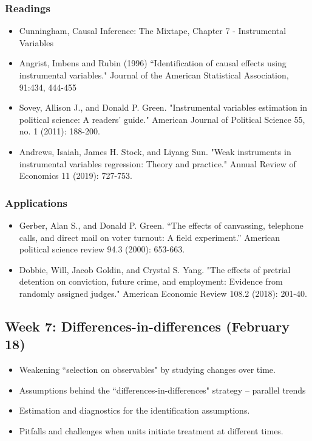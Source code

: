 \documentclass[11pt, article, oneside]{memoir}
\theoremstyle{Assumption}
\begin{document}
\subsubsection*{Readings}

\begin{itemize}
\item Cunningham, Causal Inference: The Mixtape, Chapter 7 - Instrumental Variables
\item Angrist, Imbens and Rubin (1996) ``Identification of causal effects using instrumental variables." Journal of the American Statistical Association, 91:434, 444-455
\item Sovey, Allison J., and Donald P. Green. "Instrumental variables estimation in political science: A readers’ guide." American Journal of Political Science 55, no. 1 (2011): 188-200.
\item Andrews, Isaiah, James H. Stock, and Liyang Sun. "Weak instruments in instrumental variables regression: Theory and practice." Annual Review of Economics 11 (2019): 727-753.
\end{itemize}

\subsubsection{Applications}

\begin{itemize}
\item Gerber, Alan S., and Donald P. Green. “The effects of canvassing, telephone calls,
and direct mail on voter turnout: A field experiment.” American political science
review 94.3 (2000): 653-663.
\item Dobbie, Will, Jacob Goldin, and Crystal S. Yang. "The effects of pretrial detention on conviction, future crime, and employment: Evidence from randomly assigned judges." American Economic Review 108.2 (2018): 201-40.
\end{itemize}


\subsection{Week 7: Differences-in-differences (February 18)}

\begin{itemize}
\item Weakening ``selection on observables" by studying changes over time. 
\item Assumptions behind the ``differences-in-differences" strategy -- parallel trends
\item Estimation and diagnostics for the identification assumptions.
\item Pitfalls and challenges when units initiate treatment at different times. 
\end{itemize}
\end{document}

